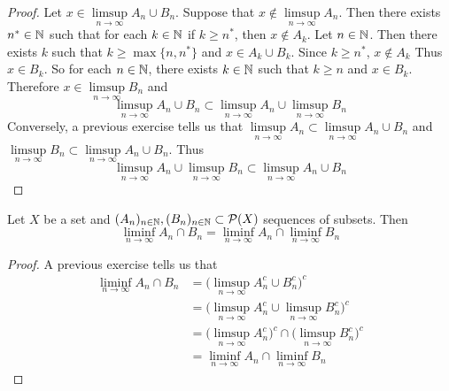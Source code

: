 \documentclass{book}
\begin{document}
	\begin{proof}
		Let $x \in \limsup\limits_{n \rightarrow \infty} A_n \cup B_n$. Suppose that $x \not \in \limsup\limits_{n \rightarrow \infty} A_n$. Then there exists $n^* \in \mathbb{N}$ such that for each $k \in \mathbb{N}$ if $ k \geq n^*$, then $x \not \in A_k$. Let $n \in \mathbb{N}$. Then there exists $k$ such that $k \geq \max\{n, n^*\}$ and $x \in A_{k} \cup B_k$. Since $k \geq n^*$, $x \not \in A_{k}$ Thus $x \in B_k$. So for each $n \in \mathbb{N}$, there exists $k \in \mathbb{N}$ such that $k \geq n$ and $x \in B_k$. Therefore $x \in \limsup\limits_{n \rightarrow \infty}  B_n$ and $$\limsup\limits_{n \rightarrow \infty} A_n \cup B_n \subset \limsup\limits_{n \rightarrow \infty} A_n \cup \limsup\limits_{n \rightarrow \infty} B_n$$ Conversely, a previous exercise tells us that $\limsup\limits_{n \rightarrow \infty} A_n \subset \limsup\limits_{n \rightarrow \infty} A_n \cup B_n$ and $\limsup\limits_{n \rightarrow \infty}  B_n \subset \limsup\limits_{n \rightarrow \infty} A_n \cup B_n$. Thus $$ \limsup\limits_{n \rightarrow \infty} A_n \cup \limsup\limits_{n \rightarrow \infty} B_n \subset \limsup\limits_{n \rightarrow \infty} A_n \cup B_n$$
	\end{proof}
	
	\begin{ex}  
		Let $X$ be a set and $(A_n)_{n \in \mathbb{N}}, (B_n)_{n \in \mathbb{N}} \subset \mathcal{P}(X)$ sequences of subsets. Then $$\liminf\limits_{n \rightarrow \infty} A_n \cap B_n= \liminf\limits_{n \rightarrow \infty} A_n \cap \liminf\limits_{n \rightarrow \infty} B_n$$
	\end{ex}
	
	\begin{proof}
		A previous exercise tells us that 
		\begin{align*}
			\liminf\limits_{n \rightarrow \infty} A_n \cap B_n
			&= \bigg( \limsup\limits_{n \rightarrow \infty} A_n^c \cup B_n^c \bigg)^c \\
			&= \bigg( \limsup\limits_{n \rightarrow \infty} A_n^c \cup \limsup\limits_{n \rightarrow \infty}B_n^c \bigg)^c \\
			&= \bigg( \limsup\limits_{n \rightarrow \infty} A_n^c \bigg)^c \cap \bigg( \limsup\limits_{n \rightarrow \infty}B_n^c \bigg)^c \\
			&= \liminf\limits_{n \rightarrow \infty} A_n \cap \liminf\limits_{n \rightarrow \infty}  B_n
		\end{align*}
	\end{proof}
	
	
	
\end{document}
